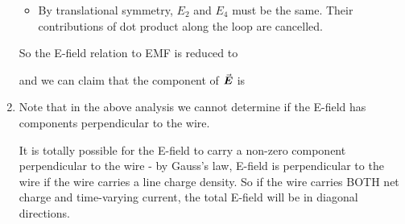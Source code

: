 \documentclass[class=article, crop=false, 12pt]{standalone}
\begin{document}
\begin{example}
\begin{enumerate}
\begin{itemize}
            
            \item By translational symmetry, 
            $E_2$ and $E_4$ must be the same. 
            Their contributions of dot product along the loop are cancelled.
        \end{itemize}
        
        So the E-field relation to EMF is reduced to
        
        and we can claim that the component of $\va*{E}$  is

        \item Note that in the above analysis
        we cannot determine if the E-field has components perpendicular to the wire.


        It is totally possible for the E-field to carry a non-zero component perpendicular to the wire -
        by Gauss's law, 
        E-field is perpendicular to the wire if the wire carries a  line charge density.
        So if the wire carries BOTH net charge and time-varying current,
        the total E-field will be in diagonal directions.


    \end{enumerate}

    
\end{example}
\theend
\end{document}
